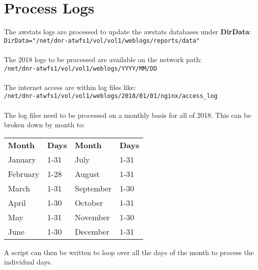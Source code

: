 
\newpage
\section{Process Logs}
The awstats logs are processed to update the awstats databases
under \textbf{DirData}:\\
\indent\texttt{DirData="/net/dnr-atwfs1/vol/vol1/weblogs/reports/data"}\\
\\
The 2018 logs to be processed are available on the network path:\\
\indent\texttt{/net/dnr-atwfs1/vol/vol1/weblogs/YYYY/MM/DD}\\
\\
The internet access are within log files like:\\
\indent\texttt{/net/dnr-atwfs1/vol/vol1/weblogs/2018/01/01/nginx/access\_log}\\
\\
The log files need to be processed on a monthly basis for all of
2018. This can be broken down by month to:
\\
\begin{center}
\begin{tabular}{l@{\hskip0.5in}l@{\hskip1.5in}l@{\hskip0.5in}l}
\bf{Month} & \bf{Days} & \bf{Month} & \bf{Days} \\
January    & 1-31      & July       & 1-31 \\
February   & 1-28      & August     & 1-31 \\
March      & 1-31      & September  & 1-30 \\
April      & 1-30      & October    & 1-31 \\
May        & 1-31      & November   & 1-30 \\
June       & 1-30      & December   & 1-31 \\
\end{tabular}
\end{center}


A script can then be written to loop over all the days 
of the month to process the individual days.
